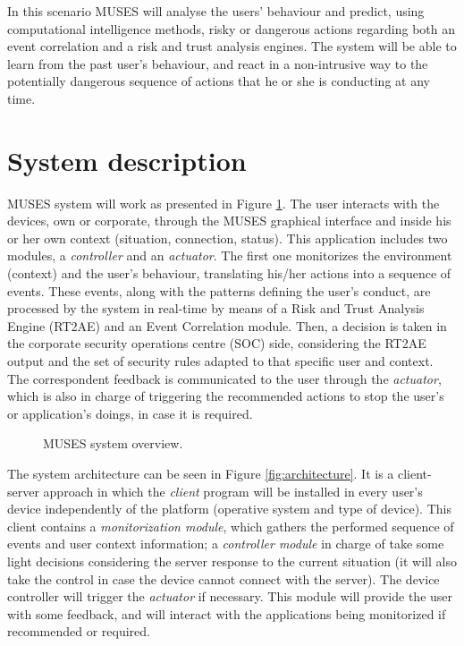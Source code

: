 \documentclass{sig-alternate}
\begin{document}
In this scenario MUSES will analyse the users' behaviour and predict, using computational intelligence methods, risky or dangerous actions regarding both an event correlation and a risk and trust analysis engines. The system will be able to learn from the past user's behaviour, and react in a non-intrusive way to the potentially dangerous sequence of actions that he or she is conducting at any time.


%
%
\section{System description}
\label{sec:system}

MUSES system will work as presented in Figure \ref{fig:system_overview}. The user interacts with the devices, own or corporate, through the MUSES graphical interface and inside his or her own context (situation, connection, status). This application includes two modules, a \textit{controller} and an \textit{actuator}. The first one monitorizes the environment (context) and the user's behaviour, translating his/her actions into a sequence of events. These events, along with the patterns defining the user's conduct, are processed by the system in real-time by means of a Risk and Trust Analysis Engine (RT2AE) and an Event Correlation module. Then, a decision is taken in the corporate security operations centre (SOC) side, considering the RT2AE output and the set of security rules adapted to that specific user and context. The correspondent feedback is communicated to the user through the \textit{actuator}, which is also in charge of triggering the recommended actions to stop the user's or application's doings, in case it is required.

\begin{figure}
\centering
{}
\caption{MUSES system overview.\label{fig:system_overview}}
\end{figure}

The system architecture can be seen in Figure \ref{fig:architecture}. It is a client-server approach in which the \textit{client} program will be installed in every user's device independently of the platform (operative system and type of device). This client contains a \textit{monitorization module}, which gathers the performed sequence of events and user context information; a \textit{controller module} in charge of take some light decisions considering the server response to the current situation (it will also take the control in case the device cannot connect with the server). The device controller will trigger the \textit{actuator} if necessary. This module will provide the user with some feedback, and will interact with the applications being monitorized if recommended or required.
\end{document}
